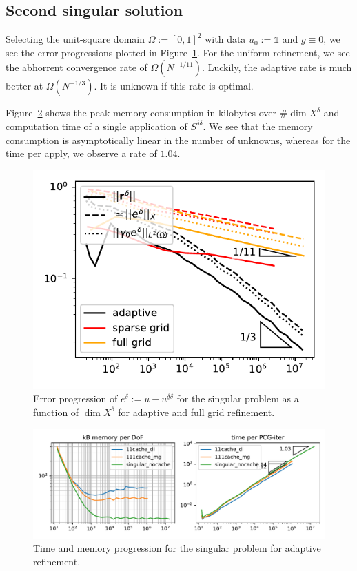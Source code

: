 \documentclass[11pt,a4paper,oneside,english]{amsart}
\numberwithin{equation}{section}
\numberwithin{theorem}{section}
\theoremstyle{definition}
\renewcommand{\O}{\Omega}
\newcommand{\udelta}{{\underline{\delta}}}
\newcommand{\jw}[1]{{\color{red}{JW: #1}}}
\newcommand{\bbone}{\mathds{1}}
\begin{document}
\subsection{Second singular solution}
Selecting the unit-square domain $\Omega := [0,1]^2$ with data $u_0 := \bbone$
and $g \equiv 0$, we see the error progressions plotted in Figure~\ref{fig:singular-error}.
For the uniform refinement, we see the abhorrent convergence rate of $\O(N^{-1/11})$.
Luckily, the adaptive rate is much better at $\O(N^{-1/3})$. It is unknown
if this rate is optimal.

Figure~\ref{fig:singular-time-memory} shows the peak memory consumption in kilobytes
over $\# \dim X^\delta$ and computation time of a single application of $S^{\udelta \delta}$.
We see that the memory consumption is asymptotically linear in the number of
unknowns, whereas for the time per apply, we observe a rate of $1.04$.\jw{dit is natuurlijk groter dan 1. Is het wel acceptabel?}

\begin{figure}
  \includegraphics[width=0.5\linewidth]{singular_adaptive_errors}
  \caption{Error progression of $e^\delta := u - u^{\underline{\delta}\delta}$ for the singular problem as
  a function of $\dim X^\delta$ for adaptive and full grid refinement.\jw{excuse the terrible graph}}
  \label{fig:singular-error}
\end{figure}
\begin{figure}
  \includegraphics[width=\linewidth]{singular_mem_time.pdf}
  \caption{Time and memory progression for the singular problem for adaptive refinement.\jw{excuse the terrible graph}}
  \label{fig:singular-time-memory}
\end{figure}



 

\end{document}

